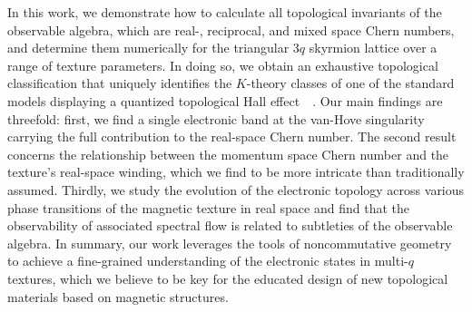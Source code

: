 \documentclass[submission, Phys]{SciPost}
\begin{document}
In this work, we demonstrate how to calculate all topological invariants of the observable algebra, which are real-, reciprocal, and mixed space Chern numbers, and determine them numerically for the triangular $3q$ skyrmion lattice over a range of texture parameters.
In doing so, we obtain an exhaustive topological classification that uniquely identifies the $K$-theory classes of one of the standard models displaying a quantized topological Hall effect~\cite{Hamamoto2015}~\cite{Gobel2017, Gobel2017b}.
Our main findings are threefold: first, we find a single electronic band at the van-Hove singularity carrying the full contribution to the real-space Chern number. 
The second result concerns the relationship between the momentum space Chern number and the texture's real-space winding, which we find to be more intricate than traditionally assumed.
Thirdly, we study the evolution of the electronic topology across various phase transitions of the magnetic texture in real space and find that the observability of associated spectral flow is related to subtleties of the observable algebra. 
In summary, our work leverages the tools of noncommutative geometry to achieve a fine-grained understanding of the electronic states in multi-$q$ textures, which we believe to be key for the educated design of new topological materials based on magnetic structures.
\end{document}
